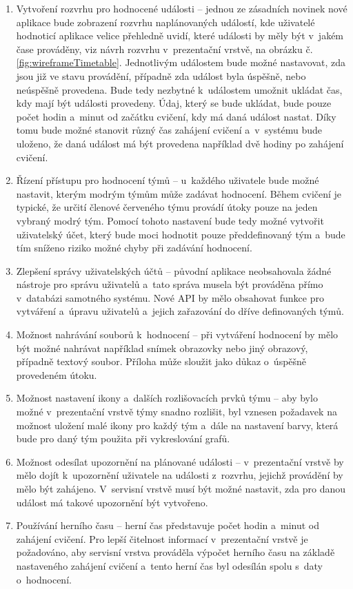 \documentclass[
  digital,
  twoside,
  table, 
  nolof, 
  nolot
]{fithesis3}
\begin{document}
\begin{enumerate}
\item Vytvoření rozvrhu pro hodnocené události -- jednou ze zásadních novinek nové aplikace bude zobrazení rozvrhu naplánovaných událostí, kde uživatelé hodnoticí aplikace velice přehledně uvidí, které události by měly být v~jakém čase prováděny, viz návrh rozvrhu v~prezentační vrstvě, na obrázku č. \ref{fig:wireframeTimetable}. Jednotlivým událostem bude možné nastavovat, zda jsou již ve stavu provádění, případně zda událost byla úspěšně, nebo neúspěšně provedena. Bude tedy nezbytné k~událostem umožnit ukládat čas, kdy mají být události provedeny. Údaj, který se bude ukládat, bude pouze počet hodin a~minut od začátku cvičení, kdy má daná událost nastat. Díky tomu bude možné stanovit různý čas zahájení cvičení a~v~systému bude uloženo, že daná událost má být provedena například dvě hodiny po zahájení cvičení.
\item Řízení přístupu pro hodnocení týmů -- u~každého uživatele bude možné nastavit, kterým modrým týmům může zadávat hodnocení. Během cvičení je typické, že určití členové červeného týmu provádí útoky pouze na jeden vybraný modrý tým. Pomocí tohoto nastavení bude tedy možné vytvořit uživatelský účet, který bude moci hodnotit pouze předdefinovaný tým a~bude tím sníženo riziko možné chyby při zadávání hodnocení.
\item Zlepšení správy uživatelských účtů -- původní aplikace neobsahovala žádné nástroje pro správu uživatelů a~tato správa musela být prováděna přímo v~databázi samotného systému. Nové API by mělo obsahovat funkce pro vytváření a~úpravu uživatelů a~jejich zařazování do dříve definovaných týmů.
\item Možnost nahrávání souborů k~hodnocení -- při vytváření hodnocení by mělo být možné nahrávat například snímek obrazovky nebo jiný obrazový, případně textový soubor. Příloha může sloužit jako důkaz o~úspěšně provedeném útoku.
\item Možnost nastavení ikony a~dalších rozlišovacích prvků týmu -- aby bylo možné v~prezentační vrstvě týmy snadno rozlišit, byl vznesen požadavek na možnost uložení malé ikony pro každý tým a~dále na nastavení barvy, která bude pro daný tým použita při vykreslování grafů.
\item Možnost odesílat upozornění na plánované události -- v~prezentační vrstvě by mělo dojít k~upozornění uživatele na události z~rozvrhu, jejichž provádění by mělo být zahájeno. V~servisní vrstvě musí být možné nastavit, zda pro danou událost má takové upozornění být vytvořeno.
\label{pozadavek6}
\item Používání herního času -- herní čas představuje počet hodin a~minut od zahájení cvičení. Pro lepší čitelnost informací v~prezentační vrstvě je požadováno, aby servisní vrstva prováděla výpočet herního času na základě nastaveného zahájení cvičení a~tento herní čas byl odesílán spolu s~daty o~hodnocení.
\end{enumerate}
\end{document}
